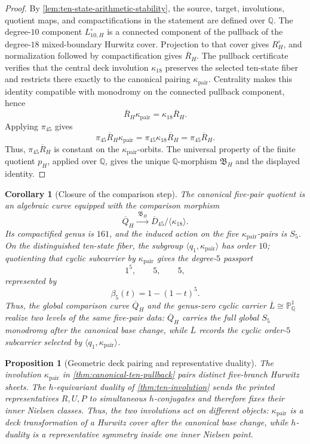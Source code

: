\documentclass[11pt]{article}
\newtheorem{proposition}[theorem]{Proposition}
\newtheorem{corollary}[theorem]{Corollary}
\theoremstyle{remark}
\newcommand{\Q}{\mathbb Q}
\begin{document}
\begin{proof}
By \cref{lem:ten-state-arithmetic-stability}, the source, target, involutions, quotient maps, and compactifications in the statement are defined over $\Q$.  The degree-$10$ component $L_{10,H}^{\circ}$ is a connected component of the pullback of the degree-$18$ mixed-boundary Hurwitz cover.  Projection to that cover gives $R_H^{\circ}$, and normalization followed by compactification gives $\overline R_H$.  The pullback certificate verifies that the central deck involution $\kappa_{18}$ preserves the selected ten-state fiber and restricts there exactly to the canonical pairing $\kappa_{\mathrm{pair}}$.  Centrality makes this identity compatible with monodromy on the connected pullback component, hence
\[
 \overline R_H\kappa_{\mathrm{pair}}=\kappa_{18}\overline R_H.
\]
Applying $\pi_{45}$ gives
\[
 \pi_{45}\overline R_H\kappa_{\mathrm{pair}}
 =\pi_{45}\kappa_{18}\overline R_H
 =\pi_{45}\overline R_H.
\]
Thus, $\pi_{45}\overline R_H$ is constant on the $\kappa_{\mathrm{pair}}$-orbits.  The universal property of the finite quotient $p_H$, applied over $\Q$, gives the unique $\Q$-morphism $\mathfrak B_H$ and the displayed identity.
\end{proof}

\begin{corollary}[Closure of the comparison step]
\label{cor:comparison-step-closed}
The canonical five-pair quotient is an algebraic curve equipped with the comparison morphism
\[
 \boxed{
 \overline Q_H
 \xrightarrow{\;\mathfrak B_H\;}
 \overline D_{45}/\langle\kappa_{18}\rangle.
 }
\]
Its compactified genus is $161$, and the induced action on the five $\kappa_{\mathrm{pair}}$-pairs is $S_5$.  On the distinguished ten-state fiber, the subgroup $\langle q_1,\kappa_{\mathrm{pair}}\rangle$ has order $10$; quotienting that cyclic subcarrier by $\kappa_{\mathrm{pair}}$ gives the degree-$5$ passport
\[
 1^5,\qquad5,\qquad5,
\]
represented by
\[
 \boxed{\beta_5(t)=1-(1-t)^5.}
\]
Thus, the global comparison curve $\overline Q_H$ and the genus-zero cyclic carrier $\overline L\cong\mathbb P^1_{\Q}$ realize two levels of the same five-pair data: $\overline Q_H$ carries the full global $S_5$ monodromy after the canonical base change, while $\overline L$ records the cyclic order-$5$ subcarrier selected by $\langle q_1,\kappa_{\mathrm{pair}}\rangle$.
\end{corollary}

\begin{proposition}[Geometric deck pairing and representative duality]
\label{prop:typed-duality}
The involution $\kappa_{\mathrm{pair}}$ in \cref{thm:canonical-ten-pullback} pairs distinct five-branch Hurwitz sheets.  The $h$-equivariant duality of \cref{thm:ten-involution} sends the printed representatives $R,U,P$ to simultaneous $h$-conjugates and therefore fixes their inner Nielsen classes.  Thus, the two involutions act on different objects: $\kappa_{\mathrm{pair}}$ is a deck transformation of a Hurwitz cover after the canonical base change, while $h$-duality is a representative symmetry inside one inner Nielsen point.
\end{proposition}
\end{document}
